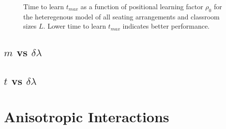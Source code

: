 \begin{figure}[htbp!]
    \label{fig:2DBPCAIH t-rho ribbon plot}
    \caption{Time to learn $t_{max}$ as a function of positional learning factor $\rho_0$ for the heteregenous model of all seating arrangements and classroom sizes $L$. Lower time to learn $t_{max}$ indicates better performance.}
 \end{figure}

\subsection{$m$ vs $\delta\lambda$}\label{subsec:BPCAIH m vs dl}

\subsection{$t$ vs $\delta\lambda$}\label{subsec:BPCAIH t vs dl}

\section{Anisotropic Interactions}
